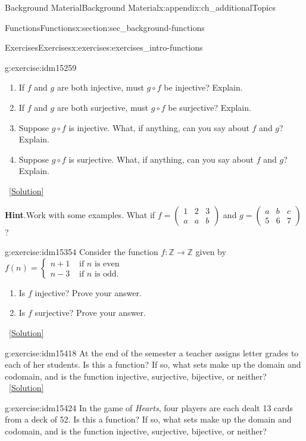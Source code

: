 \documentclass[oneside,10pt,]{book}
\numberwithin{equation}{chapter}
\def\Z{\mathbb Z}
\newcommand{\twoline}[2]{\begin{pmatrix}#1 \\ #2 \end{pmatrix}}
\newcommand{\amp}{&}
\begin{document}
\begin{appendixptx}{Background Material}{}{Background Material}{}{}{x:appendix:ch_additionalTopics}
\begin{sectionptx}{Functions}{}{Functions}{}{}{x:section:sec_background-functions}
\begin{exercises-subsection}{Exercises}{}{Exercises}{}{}{x:exercises:exercises_intro-functions}
\begin{divisionexercise}{13}{}{}{g:exercise:idm15259}
%
\begin{enumerate}[label=(\alph*)]
\item{}If \(f\) and \(g\) are both injective, must \(g\circ f\) be injective?  Explain.%
\item{}If \(f\) and \(g\) are both surjective, must \(g\circ f\) be surjective?  Explain.%
\item{}Suppose \(g\circ f\) is injective.  What, if anything, can you say about \(f\) and \(g\)?  Explain.%
\item{}Suppose \(g\circ f\) is surjective.  What, if anything, can you say about \(f\) and \(g\)?  Explain.%
\end{enumerate}
%
\qquad~\hfill{\tiny\hyperlink{g:solution:idm15301-main}{[Solution]}}\par\smallskip%
\noindent\textbf{Hint}.\hypertarget{g:hint:idm15297}{}\quad{}Work with some examples.  What if \(f = \twoline{1\amp 2 \amp 3}{a \amp a \amp b}\) and \(g = \twoline{a\amp b \amp c}{5 \amp 6 \amp 7}\)?%
\end{divisionexercise}%
\begin{divisionexercise}{14}{}{}{g:exercise:idm15354}%
Consider the function \(f:\Z \to \Z\) given by \(f(n) = \begin{cases}n+1 \amp  \text{ if }n\text{ is even} \\ n-3 \amp \text{ if }n\text{ is odd} . \end{cases}\)%
\begin{enumerate}[label=(\alph*)]
\item{}Is \(f\) injective? Prove your answer.%
\item{}Is \(f\) surjective? Prove your answer.%
\end{enumerate}
%
\qquad~\hfill{\tiny\hyperlink{g:solution:idm15366-main}{[Solution]}}\end{divisionexercise}%
\begin{divisionexercise}{15}{}{}{g:exercise:idm15418}%
At the end of the semester a teacher assigns letter grades to each of her students. Is this a function? If so, what sets make up the domain and codomain, and is the function injective, surjective, bijective, or neither?%
\qquad~\hfill{\tiny\hyperlink{g:solution:idm15421-main}{[Solution]}}\end{divisionexercise}%
\begin{divisionexercise}{16}{}{}{g:exercise:idm15424}%
In the game of \emph{Hearts}, four players are each dealt 13 cards from a deck of 52. Is this a function? If so, what sets make up the domain and codomain, and is the function injective, surjective, bijective, or neither?%

\end{divisionexercise}
\end{exercises-subsection}
\end{sectionptx}
\end{appendixptx}
\end{document}
